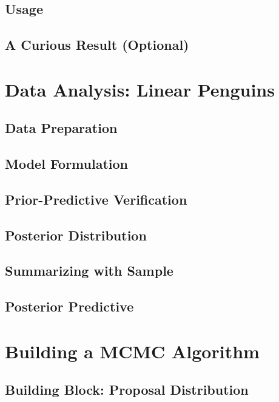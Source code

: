 \documentclass[]{article}
\begin{document}
\subsection{Usage}


\subsection{A Curious Result (Optional)}

\section{Data Analysis: Linear Penguins}

\subsection{Data Preparation}

\subsection{Model Formulation}


\subsection{Prior-Predictive Verification}


\subsection{Posterior Distribution}


\subsection{Summarizing with Sample}

\subsection{Posterior Predictive}

\section{Building a MCMC Algorithm}

\subsection{Building Block: Proposal Distribution}

\end{document}
